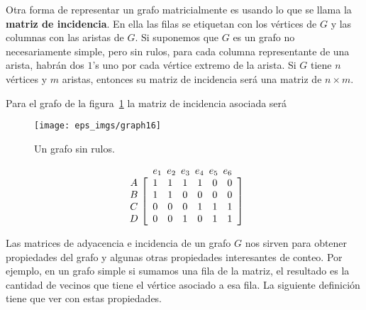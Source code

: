 Otra forma de representar un grafo matricialmente es usando lo que se llama la {\bf matriz de incidencia}.
En ella las filas se etiquetan con los vértices de $G$ y las columnas con las aristas de $G$.
Si suponemos que $G$ es un grafo no necesariamente simple, pero sin rulos, para cada columna representante de una arista, habrán dos $1$'s uno por cada vértice extremo de la arista.
Si $G$ tiene $n$ vértices y $m$ aristas, entonces su matriz de incidencia será una matriz de $n\times m$.

\begin{ejemplo}
Para el grafo de la figura~\ref{fig:graph16} la matriz de incidencia asociada será
\begin{figure}
\centering
\texttt{[image: eps\_imgs/graph16]}
\caption{Un grafo sin rulos.}
\label{fig:graph16}
\end{figure}
\[
\begin{array}{cc}
& \hspace*{-1.2em}
\begin{array}{ccccccccccc}
e_1\hspace*{-0.5em}&e_2\hspace*{-0.5em}&e_3\hspace*{-0.5em}&e_4\hspace*{-0.5em}&e_5\hspace*{-0.5em}&e_6
\end{array}\\
\begin{array}{c}
A\\
B\\
C\\
D
\end{array}
& \hspace*{-1.2em}
\left[
\begin{array}{ccccccccccccc}
1&1&1&1&0&0\\
1&1&0&0&0&0\\
0&0&0&1&1&1\\
0&0&1&0&1&1
\end{array}
\right]
\end{array}
\]
\end{ejemplo}

Las matrices de adyacencia e incidencia de un grafo $G$ nos sirven para obtener propiedades del grafo y algunas otras propiedades interesantes de conteo. 
Por ejemplo, en un grafo simple si sumamos una fila de la matriz, el resultado es la cantidad de vecinos que tiene el vértice asociado a esa fila.
La siguiente definición tiene que ver con estas propiedades.

